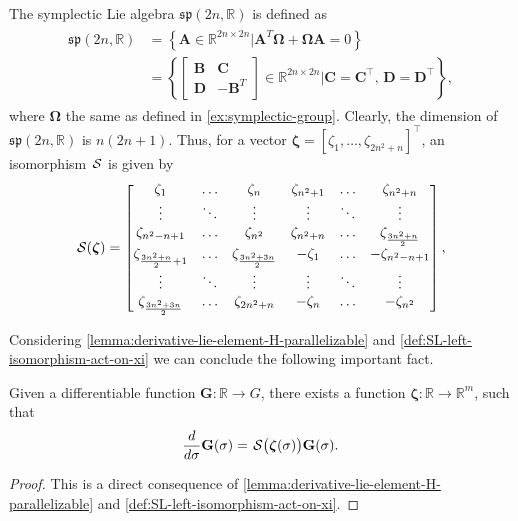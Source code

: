 \begin{example}
    The symplectic Lie algebra $\mathfrak{sp}(2n, \mathbb{R})$ is defined as
    \begin{align}
        \begin{split}
            \mathfrak{sp}(2n, \mathbb{R}) &= \left\{ \mathbf{A} \in \mathbb{R}^{2n\times 2n} | \mathbf{A}^T\boldsymbol{\Omega} + \boldsymbol{\Omega}\mathbf{A} = 0 \right\} \\&= \left\{ \begin{bmatrix} \mathbf{B} & \mathbf{C} \\ \mathbf{D} & -\mathbf{B}^T \end{bmatrix}\in \mathbb{R}^{2n\times 2n}| \mathbf{C} = \mathbf{C}^\top,\, \mathbf{D} = \mathbf{D}^\top\right\},            
        \end{split}
    \end{align}
    where $\boldsymbol{\Omega}$ the same as defined in \autoref{ex:symplectic-group}. Clearly, the dimension of $\mathfrak{sp}(2n, \mathbb{R})$ is $n(2n + 1)$. Thus,
    for a vector $\boldsymbol{\zeta} = [\zeta_1, \dots, \zeta_{2n^2+n}]^\top$, an isomorphism $\SL$ is given by
    \begin{align}
        \SL[\boldsymbol{\zeta}] = \begin{bmatrix}
            \zeta_1 & \dots & \zeta_n & \zeta_{n^2 + 1} & \dots & \zeta_{n^2 + n} \\
            \vdots & \ddots & \vdots & \vdots & \ddots & \vdots \\
            \zeta_{n^2 - n + 1} & \dots & \zeta_{n^2} & \zeta_{n^2 + n} & \dots & \zeta_{\frac{3n^2+n}{2}}\\
            \zeta_{\frac{3n^2+n}{2} + 1} & \dots & \zeta_{\frac{3n^2+3n}{2}} & -\zeta_1 & \dots & -\zeta_{n^2 - n + 1}\\
            \vdots & \ddots & \vdots & \vdots & \ddots & \vdots\\
            \zeta_{\frac{3n^2+3n}{2}} & \dots & \zeta_{2n^2 + n}& -\zeta_n & \dots & -\zeta_{n^2} 
        \end{bmatrix},
    \end{align}
\end{example}

Considering \autoref{lemma:derivative-lie-element-H-parallelizable} and \autoref{def:SL-left-isomorphism-act-on-xi} we can conclude the following important fact.

\begin{lemma} \label{lemma:very-important-fact}
    Given a differentiable function $\mathbf{\mathbf{G}}:\mathbb{R}\to G$, there exists a function $\boldsymbol{\zeta}:\mathbb{R}\to\mathbb{R}^m$, such that
    \begin{align}
    \label{eq:importantresult}
    \frac{d}{d\sigma} \mathbf{\mathbf{G}}(\sigma)=\SL\bigl(\boldsymbol{\zeta}(\sigma)\bigr)\mathbf{\mathbf{G}}(\sigma). 
\end{align}

\end{lemma}
\begin{proof} This is a direct consequence of \cref{lemma:derivative-lie-element-H-parallelizable} and \cref{def:SL-left-isomorphism-act-on-xi}. 
\end{proof}

